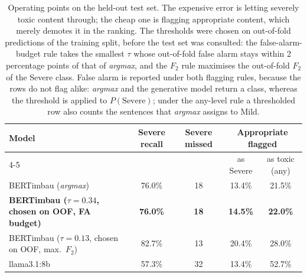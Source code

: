 \begin{table}[!t]
\centering
\caption{Operating points on the held-out test set. The expensive error is letting severely toxic content through; the cheap one is flagging appropriate content, which merely demotes it in the ranking. The thresholds were chosen on out-of-fold predictions of the training split, before the test set was consulted: the false-alarm-budget rule takes the smallest $\tau$ whose out-of-fold false alarm stays within 2 percentage points of that of \emph{argmax}, and the $F_2$ rule maximises the out-of-fold $F_2$ of the Severe class. False alarm is reported under both flagging rules, because the rows do not flag alike: \emph{argmax} and the generative model return a class, whereas the threshold is applied to $P(\text{Severe})$; under the any-level rule a thresholded row also counts the sentences that \emph{argmax} assigns to Mild.}
\label{tab:pontos-operacao}
\begin{tabular}{lcccc}
\toprule
Model & Severe recall & Severe missed & \multicolumn{2}{c}{Appropriate flagged} \\
\cmidrule(lr){4-5}
 & & & as Severe & as toxic (any)  \\
\midrule
BERTimbau (\emph{argmax}) & 76.0\% & 18 & 13.4\% & 21.5\% \\
\textbf{BERTimbau ($\tau = 0.34$, chosen on OOF, FA budget)} & \textbf{76.0\%} & \textbf{18} & \textbf{14.5\%} & \textbf{22.0\%} \\
BERTimbau ($\tau = 0.13$, chosen on OOF, max.\ $F_2$) & 82.7\% & 13 & 20.4\% & 28.0\% \\
llama3.1:8b & 57.3\% & 32 & 13.4\% & 52.7\% \\
\bottomrule
\end{tabular}
\end{table}
